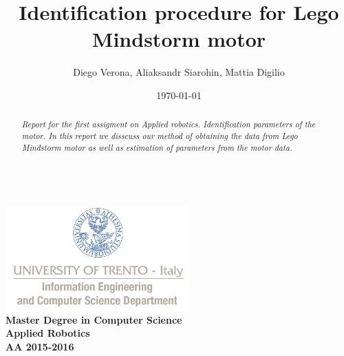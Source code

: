 \documentclass[a4paper,12pt,oneside]{article}
\title{Identification procedure for Lego Mindstorm motor}
\author{Diego Verona, Aliaksandr Siarohin, Mattia Digilio}
\date{\today}
\begin{document}
\makeatletter  %
\begin{titlepage}
      \centering
      ~~~~~~~~~~~~~\\[-30mm]
      \includegraphics[keepaspectratio=true, width=7cm]{bg_eng_1r.jpg} \\[10mm]

     {
     \large \bfseries Master Degree in Computer Science\\[3mm] 
     Applied Robotics\\[3mm]
     AA 2015-2016
     }\\[10mm]


     \vspace{0.5cm}
     {
     \Large \bfseries \textcolor{blue}{\@title} \par
     }
     \vspace{0.5cm}
     \vspace{0.2cm}

     {\large {\@author}}
     \\ \vspace{.2cm}
     \@date

     \vspace{0.6cm}


\begin{abstract}

\textit{
  Report for the first assigment on Applied robotics. Identification parameters of the motor. In this report we disscuss our method of obtaining the data from Lego Mindstorm motor as well as estimation of parameters from the motor  data.
}


\end{abstract}

\end{titlepage}
\end{document}

